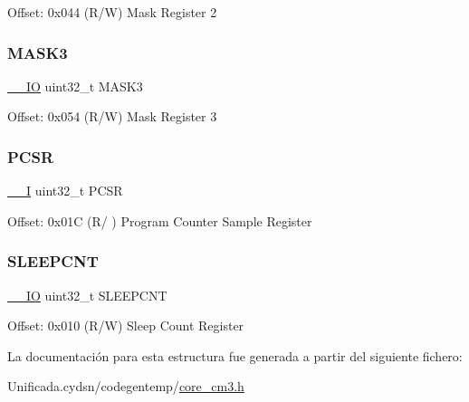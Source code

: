 Offset\+: 0x044 (R/W) Mask Register 2 \mbox{\label{struct_d_w_t___type_a541b20e412d5586312fa4dac4a151660}} 
\subsubsection{\texorpdfstring{M\+A\+S\+K3}{MASK3}}
{\footnotesize\ttfamily \mbox{\hyperlink{core__cm3_8h_aec43007d9998a0a0e01faede4133d6be}{\+\_\+\+\_\+\+IO}} uint32\+\_\+t M\+A\+S\+K3}

Offset\+: 0x054 (R/W) Mask Register 3 \mbox{\label{struct_d_w_t___type_accef6b622c8a41342ed32345b0922bea}} 
\subsubsection{\texorpdfstring{P\+C\+SR}{PCSR}}
{\footnotesize\ttfamily \mbox{\hyperlink{core__cm3_8h_af63697ed9952cc71e1225efe205f6cd3}{\+\_\+\+\_\+I}} uint32\+\_\+t P\+C\+SR}

Offset\+: 0x01C (R/ ) Program Counter Sample Register \mbox{\label{struct_d_w_t___type_a720f3795a53a8d8f275df636fee1aee7}} 
\subsubsection{\texorpdfstring{S\+L\+E\+E\+P\+C\+NT}{SLEEPCNT}}
{\footnotesize\ttfamily \mbox{\hyperlink{core__cm3_8h_aec43007d9998a0a0e01faede4133d6be}{\+\_\+\+\_\+\+IO}} uint32\+\_\+t S\+L\+E\+E\+P\+C\+NT}

Offset\+: 0x010 (R/W) Sleep Count Register 

La documentación para esta estructura fue generada a partir del siguiente fichero\+:\begin{DoxyCompactItemize}
\item 
Unificada.\+cydsn/codegentemp/\mbox{\hyperlink{core__cm3_8h}{core\+\_\+cm3.\+h}}\end{DoxyCompactItemize}
